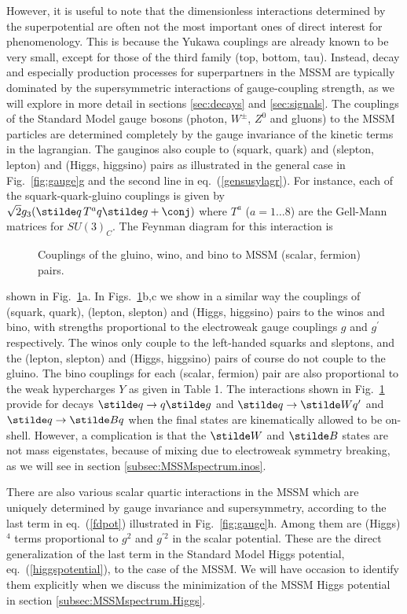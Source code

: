 However, it is
useful to note that the dimensionless interactions determined
by the superpotential are often
not the most important ones of direct
interest for phenomenology. This is because the Yukawa couplings
are already known to be very small, except for those
of the third family (top, bottom, tau).
Instead, decay and especially production processes
for superpartners in the MSSM are typically dominated by the
supersymmetric interactions of gauge-coupling strength, as we will
explore in more detail in sections \ref{sec:decays} and \ref{sec:signals}.
The couplings of the Standard
Model gauge bosons (photon, $W^\pm$, $Z^0$ and gluons) to the MSSM
particles are determined completely by the gauge invariance of
the kinetic terms in the lagrangian. The gauginos also couple to
(squark, quark) and (slepton, lepton)  and (Higgs, higgsino) pairs
as illustrated in the general case in Fig.~\ref{fig:gauge}g and the second
line
in eq.~(\ref{gensusylagr}). For instance, each of the squark-quark-gluino
couplings is given by $\sqrt{2} g_3 (\stilde q \, T^{a} q \stilde g +
\conj)$
where
$T^a$ ($a=1\ldots 8$) are the Gell-Mann
matrices for $SU(3)_C$. The Feynman diagram for this interaction is
\begin{figure}
\centerline{}
\caption{Couplings of the gluino, wino, and bino to MSSM (scalar,
fermion) pairs.
\label{fig:gaugino}}
\end{figure}
shown in Fig.~\ref{fig:gaugino}a. In
Figs.~\ref{fig:gaugino}b,c we show in a similar way the
couplings of (squark, quark), (lepton, slepton) and (Higgs, higgsino)
pairs to the
winos and bino, with strengths proportional
to the electroweak gauge couplings $g$ and $g^\prime$ respectively.
The winos only couple to the left-handed squarks and
sleptons, and the (lepton, slepton) and (Higgs,
higgsino) pairs of course do not couple to
the gluino. The bino couplings for each (scalar, fermion) pair
are also proportional to the weak hypercharges $Y$ as given in Table 1.
The interactions shown in Fig.~\ref{fig:gaugino}
provide for decays $\stilde q \rightarrow q\stilde g$
and $\stilde q \rightarrow \stilde W q^\prime$ and $\stilde q \rightarrow
\stilde B q$ when the final states are kinematically
allowed to be on-shell. However, a complication is that the
$\stilde W$ and $\stilde B$ states are not mass eigenstates, because
of mixing due to electroweak symmetry breaking, as we will see in
section \ref{subsec:MSSMspectrum.inos}.

There are also various scalar quartic interactions in the MSSM which
are uniquely determined by gauge invariance and supersymmetry,
according to the last term in eq.~(\ref{fdpot})
illustrated in Fig.~\ref{fig:gauge}h.
Among them
are (Higgs)$^4$ terms proportional to
$g^2$ and $g^{\prime 2}$ in the scalar potential.
 These are the direct
generalization of the last term in the Standard
Model Higgs potential, eq.~(\ref{higgspotential}), to the case
of the MSSM. We will have occasion to identify them explicitly
when we discuss the minimization of the MSSM Higgs potential in
section \ref{subsec:MSSMspectrum.Higgs}.

